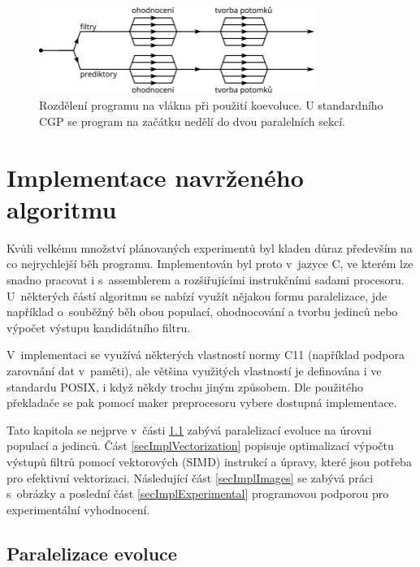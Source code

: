 \begin{figure}[htb]
    \centering
    \includegraphics[width=0.8\textwidth]{fig/openmp}
    \caption{Rozdělení programu na vlákna při použití koevoluce. U standardního CGP se program na začátku nedělí do dvou paralelních sekcí.}
    \label{obrParalelizace}
\end{figure}


\chapter{Implementace navrženého algoritmu}
\label{chImplementation}

Kvůli velkému množství plánovaných experimentů byl kladen důraz především na co nejrychlejší běh programu. Implementován byl proto v~jazyce C, ve kterém lze snadno pracovat i s~assemblerem a rozšiřujícími instrukčními sadami procesoru. U~některých částí algoritmu se nabízí využít nějakou formu paralelizace, jde například o~souběžný běh obou populací, ohodnocování a tvorbu jedinců nebo výpočet výstupu kandidátního filtru.

V~implementaci se využívá některých vlastností normy C11 (například podpora zarovnání dat v~paměti), ale většina využitých vlastností je definována i ve standardu POSIX, i když někdy trochu jiným způsobem. Dle použitého překladače se pak pomocí maker preprocesoru vybere dostupná implementace.

Tato kapitola se nejprve v~části \ref{secImplParalelization} zabývá paralelizací evoluce na úrovni populací a jedinců. Část \ref{secImplVectorization} popisuje optimalizací výpočtu výstupů filtrů pomocí vektorových (SIMD) instrukcí a úpravy, které jsou potřeba pro efektivní vektorizaci. Následující část \ref{secImplImages} se zabývá práci s~obrázky a poslední část \ref{secImplExperimental} programovou podporou pro experimentální vyhodnocení.

\section{Paralelizace evoluce}
\label{secImplParalelization}

